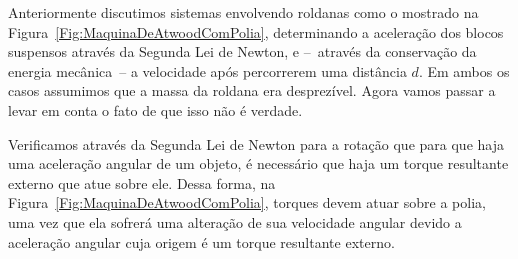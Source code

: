 Anteriormente discutimos sistemas envolvendo roldanas como o mostrado na Figura~\ref{Fig:MaquinaDeAtwoodComPolia}, determinando a aceleração dos blocos suspensos através da Segunda Lei de Newton, e --~através da conservação da energia mecânica~-- a velocidade após percorrerem uma distância $d$. Em ambos os casos assumimos que a massa da roldana era desprezível. Agora vamos passar a levar em conta o fato de que isso não é verdade.

Verificamos através da Segunda Lei de Newton para a rotação que para que haja uma aceleração angular de um objeto, é necessário que haja um torque resultante externo que atue sobre ele. Dessa forma, na Figura~\ref{Fig:MaquinaDeAtwoodComPolia}, torques devem atuar sobre a polia, uma vez que ela sofrerá uma alteração de sua velocidade angular devido a aceleração angular cuja origem é um torque resultante externo.

